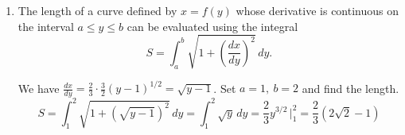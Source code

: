 \documentclass[a4paper, 12pt]{article}
\begin{document}
\begin{enumerate}[leftmargin=*,label=\textbf{\arabic*.}]
The integral diverges to negative infinity.
\item The length of a curve defined by $x=f(y)$ whose derivative is continuous on the interval $a\leq y\leq b$ can be evaluated using the integral
\[S=\int_a^b\sqrt{1+\left(\frac{dx}{dy}\right)^2}\,dy.\]

We have $\displaystyle\frac{dx}{dy}=\frac23\cdot\frac32(y-1)^{1/2}=\sqrt{y-1}$. Set $a=1,\:b=2$ and find the length.
\[S=\int_1^2\sqrt{1+\left(\sqrt{y-1}\right)^2}\,dy=\int_1^2\sqrt{y}\,dy=\frac23y^{3/2}\,\bigg|_1^2=\boxed{\frac23(2\sqrt2-1)}\]
\end{enumerate}
\end{document}
